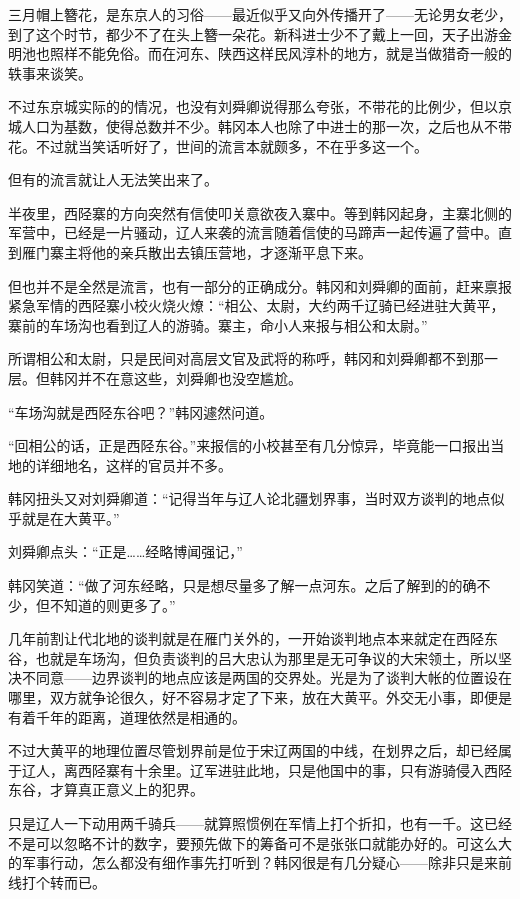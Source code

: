 三月帽上簪花，是东京人的习俗——最近似乎又向外传播开了——无论男女老少，到了这个时节，都少不了在头上簪一朵花。新科进士少不了戴上一回，天子出游金明池也照样不能免俗。而在河东、陕西这样民风淳朴的地方，就是当做猎奇一般的轶事来谈笑。

不过东京城实际的的情况，也没有刘舜卿说得那么夸张，不带花的比例少，但以京城人口为基数，使得总数并不少。韩冈本人也除了中进士的那一次，之后也从不带花。不过就当笑话听好了，世间的流言本就颇多，不在乎多这一个。

但有的流言就让人无法笑出来了。

半夜里，西陉寨的方向突然有信使叩关意欲夜入寨中。等到韩冈起身，主寨北侧的军营中，已经是一片骚动，辽人来袭的流言随着信使的马蹄声一起传遍了营中。直到雁门寨主将他的亲兵散出去镇压营地，才逐渐平息下来。

但也并不是全然是流言，也有一部分的正确成分。韩冈和刘舜卿的面前，赶来禀报紧急军情的西陉寨小校火烧火燎：“相公、太尉，大约两千辽骑已经进驻大黄平，寨前的车场沟也看到辽人的游骑。寨主，命小人来报与相公和太尉。”

所谓相公和太尉，只是民间对高层文官及武将的称呼，韩冈和刘舜卿都不到那一层。但韩冈并不在意这些，刘舜卿也没空尴尬。

“车场沟就是西陉东谷吧？”韩冈遽然问道。

“回相公的话，正是西陉东谷。”来报信的小校甚至有几分惊异，毕竟能一口报出当地的详细地名，这样的官员并不多。

韩冈扭头又对刘舜卿道：“记得当年与辽人论北疆划界事，当时双方谈判的地点似乎就是在大黄平。”

刘舜卿点头：“正是……经略博闻强记，”

韩冈笑道：“做了河东经略，只是想尽量多了解一点河东。之后了解到的的确不少，但不知道的则更多了。”

几年前割让代北地的谈判就是在雁门关外的，一开始谈判地点本来就定在西陉东谷，也就是车场沟，但负责谈判的吕大忠认为那里是无可争议的大宋领土，所以坚决不同意——边界谈判的地点应该是两国的交界处。光是为了谈判大帐的位置设在哪里，双方就争论很久，好不容易才定了下来，放在大黄平。外交无小事，即便是有着千年的距离，道理依然是相通的。

不过大黄平的地理位置尽管划界前是位于宋辽两国的中线，在划界之后，却已经属于辽人，离西陉寨有十余里。辽军进驻此地，只是他国中的事，只有游骑侵入西陉东谷，才算真正意义上的犯界。

只是辽人一下动用两千骑兵——就算照惯例在军情上打个折扣，也有一千。这已经不是可以忽略不计的数字，要预先做下的筹备可不是张张口就能办好的。可这么大的军事行动，怎么都没有细作事先打听到？韩冈很是有几分疑心——除非只是来前线打个转而已。

